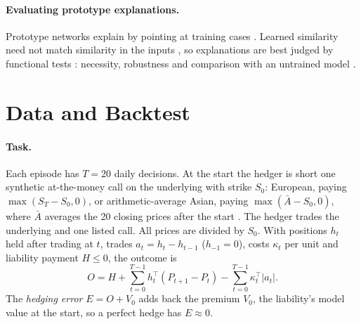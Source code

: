 \documentclass[runningheads]{llncs}
\begin{document}
\paragraph{Evaluating prototype explanations.} Prototype networks explain by pointing at training cases
\cite{li2018prototypes,chen2019looks,rudin2019stop}. Learned similarity need not match similarity in the
inputs \cite{hoffmann2021looks}, so explanations are best judged by functional tests
\cite{doshivelez2017rigorous,nauta2023anecdotal}: necessity, robustness \cite{alvarezmelis2018robustness}
and comparison with an untrained model \cite{adebayo2018sanity}.

\section{Data and Backtest}
\label{sec:data}

\paragraph{Task.} Each episode has $T=20$ daily decisions. At the start the hedger is short one synthetic
at-the-money call on the underlying with strike $S_0$: European, paying $\max(S_T-S_0,0)$, or
arithmetic-average Asian, paying $\max(\bar A-S_0,0)$, where $\bar A$ averages the 20 closing prices after
the start \cite{kemna1990asian}. The hedger trades the underlying and one listed call. All prices are
divided by $S_0$. With positions $h_t$ held after trading at $t$, trades $a_t=h_t-h_{t-1}$ ($h_{-1}=0$),
costs $\kappa_t$ per unit and liability payment $H\le0$, the outcome is
\begin{equation}
O=H+\sum_{t=0}^{T-1}h_t^{\top}(P_{t+1}-P_t)-\sum_{t=0}^{T-1}\kappa_t^{\top}\lvert a_t\rvert .
\label{eq:outcome}
\end{equation}
The \emph{hedging error} $E=O+V_0$ adds back the premium $V_0$, the liability's model value at the start,
so a perfect hedge has $E\approx0$.
\end{document}
